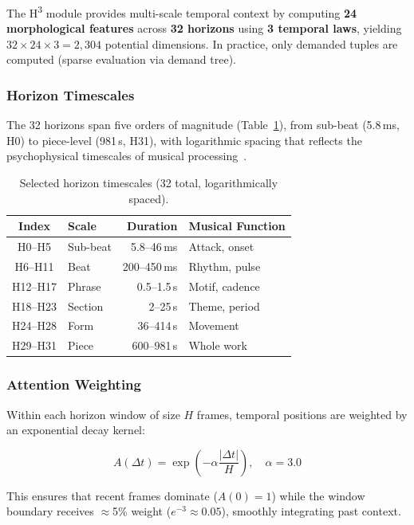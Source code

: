 \documentclass[10pt,twocolumn]{article}
\newcommand{\Htri}{H\textsuperscript{3}}
\begin{document}
The \Htri{} module provides multi-scale temporal context by computing \textbf{24 morphological features} across \textbf{32 horizons} using \textbf{3 temporal laws}, yielding $32 \times 24 \times 3 = 2{,}304$ potential dimensions. In practice, only demanded tuples are computed (sparse evaluation via demand tree).

\subsubsection{Horizon Timescales}

The 32 horizons span five orders of magnitude (Table~\ref{tab:horizons}), from sub-beat (5.8\,ms, H0) to piece-level (981\,s, H31), with logarithmic spacing that reflects the psychophysical timescales of musical processing~\cite{Poppel2009,Jones2002}.

\begin{table}[t]
\centering
\caption{Selected horizon timescales (32 total, logarithmically spaced).}
\label{tab:horizons}
\small
\begin{tabular}{@{}clrl@{}}
\toprule
\textbf{Index} & \textbf{Scale} & \textbf{Duration} & \textbf{Musical Function} \\
\midrule
H0--H5 & Sub-beat & 5.8--46\,ms & Attack, onset \\
H6--H11 & Beat & 200--450\,ms & Rhythm, pulse \\
H12--H17 & Phrase & 0.5--1.5\,s & Motif, cadence \\
H18--H23 & Section & 2--25\,s & Theme, period \\
H24--H28 & Form & 36--414\,s & Movement \\
H29--H31 & Piece & 600--981\,s & Whole work \\
\bottomrule
\end{tabular}
\end{table}

\subsubsection{Attention Weighting}

Within each horizon window of size $H$ frames, temporal positions are weighted by an exponential decay kernel:

\begin{equation}
A(\Delta t) = \exp\!\left(-\alpha \frac{|\Delta t|}{H}\right), \quad \alpha = 3.0
\label{eq:attention}
\end{equation}

\noindent This ensures that recent frames dominate ($A(0) = 1$) while the window boundary receives $\approx$5\% weight ($e^{-3} \approx 0.05$), smoothly integrating past context.
\end{document}
